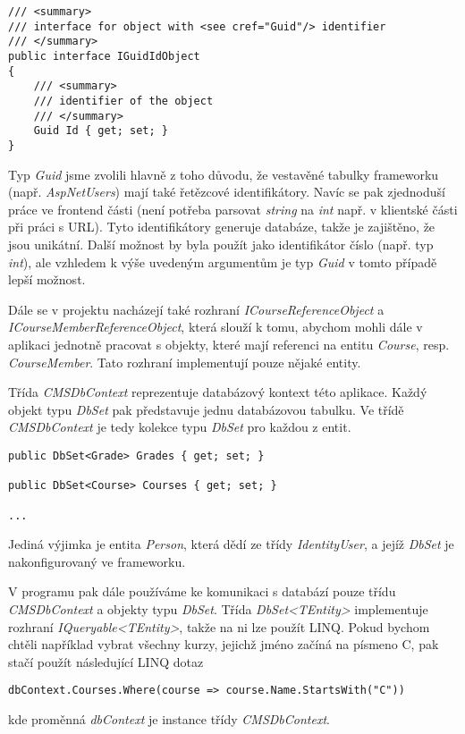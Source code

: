 \begin{lstlisting}
/// <summary>
/// interface for object with <see cref="Guid"/> identifier
/// </summary>
public interface IGuidIdObject
{
	/// <summary>
	/// identifier of the object
	/// </summary>
	Guid Id { get; set; }
}
\end{lstlisting}


Typ \textit{Guid} jsme zvolili hlavně z toho důvodu, že vestavěné tabulky frameworku (např. \textit{AspNetUsers}) mají také řetězcové identifikátory. Navíc se pak zjednoduší práce ve frontend části (není potřeba parsovat \textit{string} na \textit{int} např. v klientské části při práci s URL). Tyto identifikátory generuje databáze, takže je zajištěno, že jsou unikátní.
Další možnost by byla použít jako identifikátor číslo (např. typ \textit{int}), ale vzhledem k výše uvedeným argumentům je typ \textit{Guid} v tomto případě lepší možnost.

Dále se v projektu nacházejí také rozhraní \textit{ICourseReferenceObject} a \textit{ICourseMemberReferenceObject}, která slouží k tomu, abychom mohli dále v aplikaci jednotně pracovat s objekty, které mají referenci na entitu \textit{Course}, resp. \textit{CourseMember}. Tato rozhraní implementují pouze nějaké entity.

Třída \textit{CMSDbContext} reprezentuje databázový kontext této aplikace. Každý objekt typu \textit{DbSet} pak představuje jednu databázovou tabulku. Ve třídě \textit{CMSDbContext} je tedy kolekce typu \textit{DbSet} pro každou z entit.

\begin{lstlisting}
public DbSet<Grade> Grades { get; set; }

public DbSet<Course> Courses { get; set; }

...
\end{lstlisting}

Jediná výjimka je entita \textit{Person}, která dědí ze třídy \textit{IdentityUser}, a jejíž \textit{DbSet} je nakonfigurovaný ve frameworku. 

V programu pak dále používáme ke komunikaci s databází pouze třídu \textit{CMSDbContext} a objekty typu \textit{DbSet}. Třída \textit{DbSet<TEntity>} implementuje rozhraní \textit{IQueryable<TEntity>}, takže na ni lze použít LINQ. Pokud bychom chtěli například vybrat všechny kurzy, jejichž jméno začíná na písmeno C, pak stačí použít následující LINQ dotaz
\begin{lstlisting}
dbContext.Courses.Where(course => course.Name.StartsWith("C"))
\end{lstlisting}
kde proměnná \textit{dbContext} je instance třídy \textit{CMSDbContext}.

